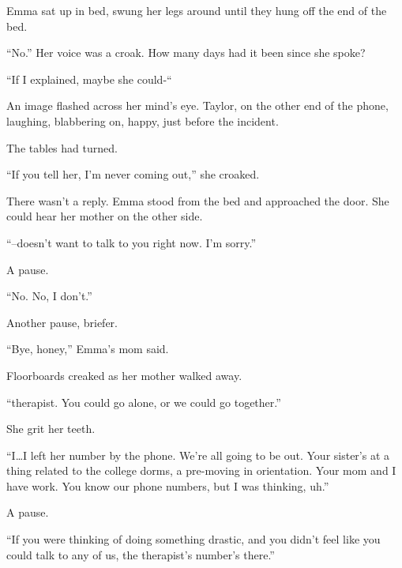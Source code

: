 Emma sat up in bed, swung her legs around until they hung off the end of the bed.



``No.''  Her voice was a croak.  How many days had it been since she spoke?



``If I explained, maybe she could-``



An image flashed across her mind's eye.  Taylor, on the other end of the phone, laughing, blabbering on, happy, just before the incident.



The tables had turned.



``If you tell her, I'm never coming out,'' she croaked.



There wasn't a reply.  Emma stood from the bed and approached the door.  She could hear her mother on the other side.



``--doesn't want to talk to you right now.  I'm sorry.''



A pause.



``No.  No, I don't.''



Another pause, briefer.



``Bye, honey,'' Emma's mom said.



Floorboards creaked as her mother walked away.



\sectionbreak



``\ldotsa therapist.  You could go alone, or we could go together.''



She grit her teeth.



``I\ldots I left her number by the phone.  We're all going to be out.  Your sister's at a thing related to the college dorms, a pre-moving in orientation.  Your mom and I have work.  You know our phone numbers, but I was thinking, uh.''



A pause.



``If you were thinking of doing something drastic, and you didn't feel like you could talk to any of us, the therapist's number's there.''



